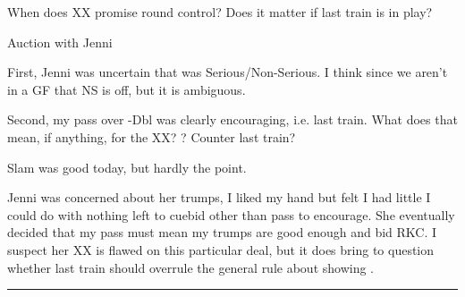 \documentclass[main]{subfile}
\begin{document}
When does XX promise \first round control? Does it matter if last train is in play?

Auction with Jenni


First, Jenni was uncertain that  was Serious/Non-Serious. I think since we aren't in a GF that NS is off, but it is ambiguous.

Second, my pass over -Dbl was clearly encouraging, i.e. last train. What does that mean, if anything, for the XX? \first? Counter last train?

Slam was good today, but hardly the point. 

\begin{handdiagram}
\end{handdiagram}

Jenni was concerned about her trumps, I liked my hand but felt I had little I could do with nothing left to cuebid other than pass to encourage. She eventually decided that my pass must mean my trumps are good enough and bid RKC. I suspect her XX is flawed on this particular deal, but it does bring to question whether last train should overrule the general rule about showing \first.

\vspace{1em}\hrule
\end{document}
